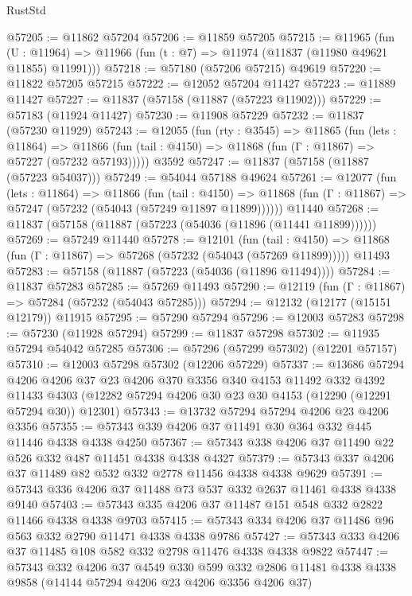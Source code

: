 \begin{lexlean}{RustStd}
\begin{coremodule}
@57205 := @11862 @57204
@57206 := @11859 @57205
@57215 := @11965
    (fun (U : @11964) => @11966 (fun (t : @7) => @11974 (@11837 (@11980 @49621 @11855) @11991)))
@57218 := @57180 (@57206 @57215) @49619
@57220 := @11822 @57205 @57215
@57222 := @12052 @57204 @11427
@57223 := @11889 @11427
@57227 := @11837 (@57158 (@11887 (@57223 @11902)))
@57229 := @57183 (@11924 @11427)
@57230 := @11908 @57229
@57232 := @11837 (@57230 @11929)
@57243 := @12055
    (fun (rty : @3545) =>
    @11865
      (fun (lets : @11864) =>
      @11866 (fun (tail : @4150) => @11868 (fun (Γ : @11867) => @57227 (@57232 @57193)))))
    @3592
@57247 := @11837 (@57158 (@11887 (@57223 @54037)))
@57249 := @54044 @57188 @49624
@57261 := @12077
    (fun (lets : @11864) =>
    @11866
      (fun (tail : @4150) =>
      @11868 (fun (Γ : @11867) => @57247 (@57232 (@54043 (@57249 @11897 @11899))))))
    @11440
@57268 := @11837 (@57158 (@11887 (@57223 (@54036 (@11896 (@11441 @11899))))))
@57269 := @57249 @11440
@57278 := @12101
    (fun (tail : @4150) => @11868 (fun (Γ : @11867) => @57268 (@57232 (@54043 (@57269 @11899)))))
    @11493
@57283 := @57158 (@11887 (@57223 (@54036 (@11896 @11494))))
@57284 := @11837 @57283
@57285 := @57269 @11493
@57290 := @12119 (fun (Γ : @11867) => @57284 (@57232 (@54043 @57285)))
@57294 := @12132 (@12177 (@15151 @12179)) @11915
@57295 := @57290 @57294
@57296 := @12003 @57283
@57298 := @57230 (@11928 @57294)
@57299 := @11837 @57298
@57302 := @11935 @57294 @54042 @57285
@57306 := @57296 (@57299 @57302) (@12201 @57157)
@57310 := @12003 @57298 @57302 (@12206 @57229)
@57337 := @13686
    @57294
    @4206
    @4206
    @37
    @23
    @4206
    @370
    @3356
    @340
    @4153
    @11492
    @332
    @4392
    @11433
    @4303
    (@12282 @57294 @4206 @30 @23 @30 @4153 (@12290 (@12291 @57294 @30)) @12301)
@57343 := @13732 @57294 @57294 @4206 @23 @4206 @3356
@57355 := @57343 @339 @4206 @37 @11491 @30 @364 @332 @445 @11446 @4338 @4338 @4250
@57367 := @57343 @338 @4206 @37 @11490 @22 @526 @332 @487 @11451 @4338 @4338 @4327
@57379 := @57343 @337 @4206 @37 @11489 @82 @532 @332 @2778 @11456 @4338 @4338 @9629
@57391 := @57343 @336 @4206 @37 @11488 @73 @537 @332 @2637 @11461 @4338 @4338 @9140
@57403 := @57343 @335 @4206 @37 @11487 @151 @548 @332 @2822 @11466 @4338 @4338 @9703
@57415 := @57343 @334 @4206 @37 @11486 @96 @563 @332 @2790 @11471 @4338 @4338 @9786
@57427 := @57343 @333 @4206 @37 @11485 @108 @582 @332 @2798 @11476 @4338 @4338 @9822
@57447 := @57343
    @332
    @4206
    @37
    @4549
    @330
    @599
    @332
    @2806
    @11481
    @4338
    @4338
    @9858
    (@14144 @57294 @4206 @23 @4206 @3356 @4206 @37)

\end{coremodule}
\end{lexlean}
